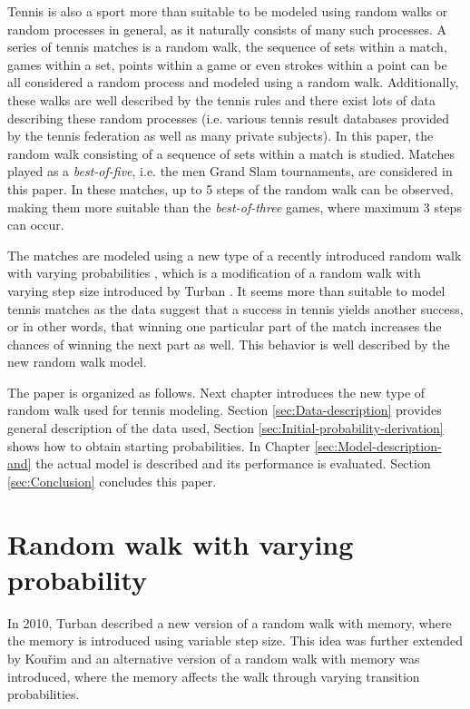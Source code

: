 \documentclass{easychair}
\begin{document}
Tennis is also a sport more than suitable to be modeled using random
walks or random processes in general, as it naturally consists of
many such processes. A series of tennis matches is a random walk,
the sequence of sets within a match, games within a set, points within
a game or even strokes within a point can be all considered a random
process and modeled using a random walk. Additionally, these walks
are well described by the tennis rules and there exist lots of data
describing these random processes (i.e. various tennis result databases
provided by the tennis federation as well as many private subjects).
In this paper, the random walk consisting of a sequence of sets within
a match is studied. Matches played as a \emph{best-of-five}, i.e.
the men Grand Slam tournaments, are considered in this paper. In these
matches, up to 5 steps of the random walk can be observed, making
them more suitable than the \emph{best-of-three }games, where maximum
3 steps can occur.

The matches are modeled using a new type of a recently introduced
random walk with varying probabilities \cite{ja2017ddny}, which is
a modification of a random walk with varying step size introduced
by Turban \cite{turban2010random}. It seems more than suitable to
model tennis matches as the data suggest that a success in tennis
yields another success, or in other words, that winning one particular
part of the match increases the chances of winning the next part as
well. This behavior is well described by the new random walk model.

The paper is organized as follows. Next chapter introduces the new
type of random walk used for tennis modeling. Section \ref{sec:Data-description}
provides general description of the data used, Section \ref{sec:Initial-probability-derivation}
shows how to obtain starting probabilities. In Chapter \ref{sec:Model-description-and}
the actual model is described and its performance is evaluated. Section
\ref{sec:Conclusion} concludes this paper.

\section{Random walk with varying probability\label{sec:Random-walk-with}}

In 2010, Turban described \cite{turban2010random} a new version of
a random walk with memory, where the memory is introduced using variable
step size. This idea was further extended by Kouřim \cite{ja2017ddny,ja2019teze}
and an alternative version of a random walk with memory was introduced,
where the memory affects the walk through varying transition probabilities.
\end{document}
